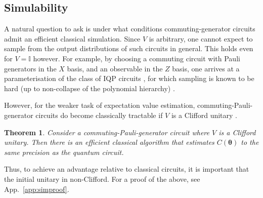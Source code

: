 \documentclass[twocolumn]{revtex4-2}
\newtheorem{theorem}{Theorem}
\renewcommand{\vec}{\boldsymbol}
\begin{document}
\subsection{Simulability}\label{sec:simulate}
A natural question to ask is under what conditions commuting-generator circuits admit an efficient classical simulation. Since $V$ is arbitrary, one cannot expect to sample from the output distributions of such circuits in general. This holds even for $V=\mathbb{I}$ however. For example, by choosing a commuting circuit with Pauli generators in the $X$ basis, and an observable in the $Z$ basis, one arrives at a parameterisation of the class of IQP circuits \cite{bremner2016average,ni2012commuting}, for which sampling is known to be hard (up to non-collapse of the polynomial hierarchy) \cite{bremner2016average}. 

However, for the weaker task of expectation value estimation, commuting-Pauli-generator circuits do become classically tractable if $V$ is a Clifford unitary \cite{ni2012commuting}.

%
\begin{theorem}\label{thm:sim}
    Consider a commuting-Pauli-generator circuit where $V$ is a Clifford unitary. Then there is an efficient classical algorithm that estimates $C(\vec{\theta})$ to the same precision as the quantum circuit.
\end{theorem}
%
Thus, to achieve an advantage relative to classical circuits, it is important that the initial unitary in non-Clifford. For a proof of the above, see App.\ \ref{app:simproof}. 
\end{document}
